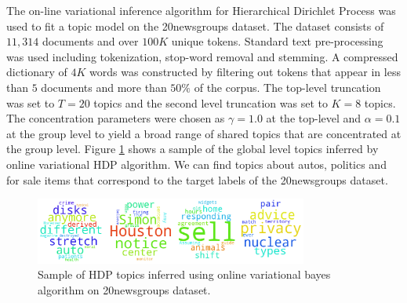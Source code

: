 The on-line variational inference algorithm for Hierarchical Dirichlet Process was used to fit a topic model on the 20newsgroups dataset. The dataset consists of $11,314$ documents and over $100K$ unique tokens. Standard text pre-processing was used including tokenization, stop-word removal and stemming. A compressed dictionary of $4K$ words was constructed by filtering out tokens that appear in less than $5$ documents and more than $50\%$ of the corpus. The top-level truncation was set to $T=20$ topics and the second level truncation was set to $K=8$ topics. The concentration parameters were chosen as $\gamma = 1.0$ at the top-level and $\alpha=0.1$ at the group level to yield a broad range of shared topics that are concentrated at the group level. Figure \ref{fig:hdp_topics} shows a sample of the global level topics inferred by online variational HDP algorithm. We can find topics about autos, politics and for sale items that correspond to the target labels of the 20newsgroups dataset.

\begin{figure}[thpb]
    \centering
    \includegraphics[width=0.8\textwidth, trim={10 10 10 10}]{figures/hdp_topics.png}
    \caption{Sample of HDP topics inferred using online variational bayes algorithm on 20newsgroups dataset.}
    \label{fig:hdp_topics}
\end{figure}
